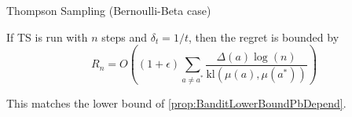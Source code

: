\documentclass[../course-notes.tex]{subfiles}
\begin{document}
\begin{algorithm}\caption{Thompson Sampling (Bernoulli-Beta case)}
\end{algorithm}

\begin{prop}
If TS is run with $n$ steps and $\delta_t = 1/t$, then the regret is bounded by
\begin{equation}
	R_n = O\left(
	(1+\epsilon) \sum_{a\neq a^*}
	\frac{\Delta(a) \log(n)}{\mathrm{kl}(\mu(a), \mu(a^*))}
	\right)
\end{equation}
\end{prop}

This matches the lower bound of \cref{prop:BanditLowerBoundPbDepend}.
\end{document}
